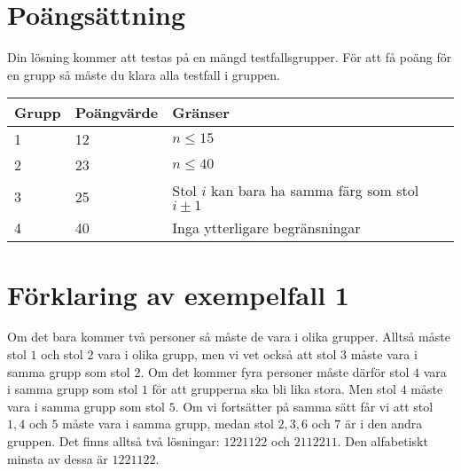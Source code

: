 \section*{Poängsättning}
Din lösning kommer att testas på en mängd testfallsgrupper.
För att få poäng för en grupp så måste du klara alla testfall i gruppen.

\noindent
\begin{tabular}{| l | l | l |}
\hline
Grupp & Poängvärde & Gränser \\ \hline
1     & 12         & $n \leq 15$\\ \hline
2     & 23         & $n \leq 40$ \\ \hline
3     & 25         & Stol $i$ kan bara ha samma färg som stol $i\pm 1$ \\ \hline
4     & 40         & Inga ytterligare begränsningar \\ \hline
\end{tabular}

\section*{Förklaring av exempelfall 1}
Om det bara kommer två personer så måste de vara i olika grupper.
Alltså måste stol $1$ och stol $2$ vara i olika grupp, men vi vet också att stol $3$
måste vara i samma grupp som stol $2$. Om det kommer fyra personer måste därför stol $4$
vara i samma grupp som stol $1$ för att grupperna ska bli lika stora. Men stol $4$ måste
vara i samma grupp som stol $5$. Om vi fortsätter på samma sätt får vi att stol $1, 4$
och $5$ måste vara i samma grupp, medan stol $2, 3, 6$ och $7$ är i den andra gruppen.
Det finns alltså två lösningar: $1221122$ och $2112211$. Den alfabetiskt minsta av
dessa är $1221122$.
